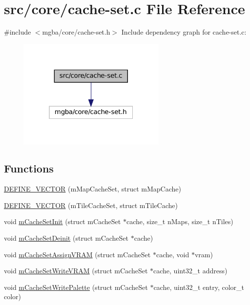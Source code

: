 \hypertarget{core_2cache-set_8c}{}\section{src/core/cache-\/set.c File Reference}
\label{core_2cache-set_8c}
{\ttfamily \#include $<$mgba/core/cache-\/set.\+h$>$}\newline
Include dependency graph for cache-\/set.c\+:
\nopagebreak
\begin{figure}[H]
\begin{center}
\leavevmode
\includegraphics[width=208pt]{core_2cache-set_8c__incl}
\end{center}
\end{figure}
\subsection*{Functions}
\begin{DoxyCompactItemize}
\item 
\mbox{\hyperlink{core_2cache-set_8c_ae9141e76f46e5dc6c9984fa89aa8d1ae}{D\+E\+F\+I\+N\+E\+\_\+\+V\+E\+C\+T\+OR}} (m\+Map\+Cache\+Set, struct m\+Map\+Cache)
\item 
\mbox{\hyperlink{core_2cache-set_8c_ad5cc5bc90c21d9400d4aa398600f6f97}{D\+E\+F\+I\+N\+E\+\_\+\+V\+E\+C\+T\+OR}} (m\+Tile\+Cache\+Set, struct m\+Tile\+Cache)
\item 
void \mbox{\hyperlink{core_2cache-set_8c_a0082eccdfc7d350d0fb3092820f4bf95}{m\+Cache\+Set\+Init}} (struct m\+Cache\+Set $\ast$cache, size\+\_\+t n\+Maps, size\+\_\+t n\+Tiles)
\item 
void \mbox{\hyperlink{core_2cache-set_8c_ae4f1af2ec62092b9a029f684d6df8630}{m\+Cache\+Set\+Deinit}} (struct m\+Cache\+Set $\ast$cache)
\item 
void \mbox{\hyperlink{core_2cache-set_8c_ac54ed5b76adf1e6bbe892e3467ca6b7a}{m\+Cache\+Set\+Assign\+V\+R\+AM}} (struct m\+Cache\+Set $\ast$cache, void $\ast$vram)
\item 
void \mbox{\hyperlink{core_2cache-set_8c_ab75388da75a72f138ca6e24089fe5158}{m\+Cache\+Set\+Write\+V\+R\+AM}} (struct m\+Cache\+Set $\ast$cache, uint32\+\_\+t address)
\item 
void \mbox{\hyperlink{core_2cache-set_8c_a911c877cb6f25d98b07830de12a90dd5}{m\+Cache\+Set\+Write\+Palette}} (struct m\+Cache\+Set $\ast$cache, uint32\+\_\+t entry, color\+\_\+t color)
\end{DoxyCompactItemize}


